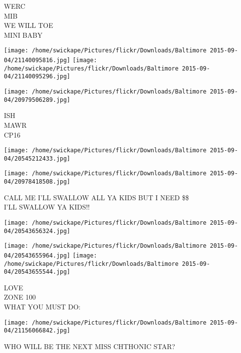 \documentclass[10pt,letterpaper]{article}
\begin{document}
WERC\\
MIB\\
WE WILL TOE\\
MINI BABY
\pagebreak

\texttt{[image: /home/swickape/Pictures/flickr/Downloads/Baltimore 2015-09-04/21140095816.jpg]}
\texttt{[image: /home/swickape/Pictures/flickr/Downloads/Baltimore 2015-09-04/21140095296.jpg]}

\vspace{0.25in}
\texttt{[image: /home/swickape/Pictures/flickr/Downloads/Baltimore 2015-09-04/20979506289.jpg]}

ISH\\
MAWR\\
CP16
\pagebreak

\texttt{[image: /home/swickape/Pictures/flickr/Downloads/Baltimore 2015-09-04/20545212433.jpg]}

\vspace{0.25in}
\texttt{[image: /home/swickape/Pictures/flickr/Downloads/Baltimore 2015-09-04/20978418508.jpg]}

CALL ME I'LL SWALLOW ALL YA KIDS BUT I NEED \$\$\\
I'LL SWALLOW YA KIDS!!
\pagebreak

\texttt{[image: /home/swickape/Pictures/flickr/Downloads/Baltimore 2015-09-04/20543656324.jpg]}

\vspace{0.25in}
\texttt{[image: /home/swickape/Pictures/flickr/Downloads/Baltimore 2015-09-04/20543655964.jpg]}
\texttt{[image: /home/swickape/Pictures/flickr/Downloads/Baltimore 2015-09-04/20543655544.jpg]}

LOVE\\
ZONE 100\\
WHAT YOU MUST DO:
\pagebreak

\texttt{[image: /home/swickape/Pictures/flickr/Downloads/Baltimore 2015-09-04/21156066842.jpg]}

WHO WILL BE THE NEXT MISS CHTHONIC STAR?
\pagebreak
\end{document}
